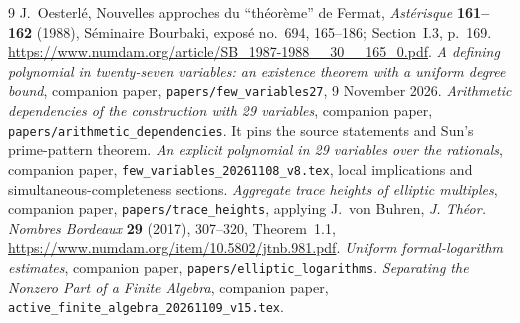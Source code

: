 \documentclass[11pt,a4paper]{article}
\begin{document}
\begin{thebibliography}{9}
J.~Oesterl\'e, Nouvelles approches du ``th\'eor\`eme'' de Fermat,
\emph{Ast\'erisque} \textbf{161--162} (1988), S\'eminaire
Bourbaki, expos\'e no.~694, 165--186; Section~I.3, p.~169.
\url{https://www.numdam.org/article/SB_1987-1988__30__165_0.pdf}.
\emph{A defining polynomial in twenty-seven variables:
an existence theorem with a uniform degree bound},
companion paper, \nolinkurl{papers/few_variables27}, 9 November 2026.
\emph{Arithmetic dependencies of the construction with 29 variables},
companion paper, \nolinkurl{papers/arithmetic_dependencies}.
It pins the source statements and Sun's prime-pattern theorem.
\emph{An explicit polynomial in 29 variables over the rationals},
companion paper, \nolinkurl{few_variables_20261108_v8.tex},
local implications and simultaneous-completeness sections.
\emph{Aggregate trace heights of elliptic multiples}, companion
paper, \nolinkurl{papers/trace_heights}, applying J.~von Buhren,
\emph{J. Th\'eor. Nombres Bordeaux} \textbf{29} (2017), 307--320,
Theorem~1.1, \url{https://www.numdam.org/item/10.5802/jtnb.981.pdf}.
\emph{Uniform formal-logarithm estimates}, companion paper,
\nolinkurl{papers/elliptic_logarithms}.
\emph{Separating the Nonzero Part of a Finite Algebra},
companion paper, \nolinkurl{active_finite_algebra_20261109_v15.tex}.
\end{thebibliography}
\end{document}
